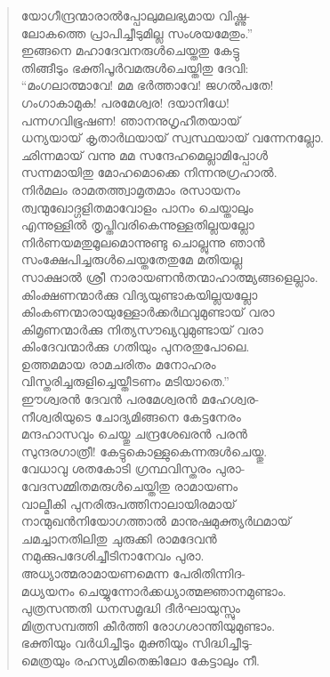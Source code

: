 \begin{verse}
യോഗീന്ദ്രന്മാരാല്‍പ്പോലുമലഭ്യമായ വിഷ്ണു-\\
ലോകത്തെ പ്രാപിച്ചീടുമില്ല സംശയമേതും.”\\
ഇങ്ങനെ മഹാദേവനരുള്‍ചെയ്തതു കേട്ടു\\
തിങ്ങീടും ഭക്തിപൂര്‍വമരുള്‍ചെയ്തിതു ദേവി:\\
“മംഗലാത്മാവേ! മമ ഭര്‍ത്താവേ! ജഗല്‍പതേ!\\
ഗംഗാകാമുക! പരമേശ്വര! ദയാനിധേ!\\
പന്നഗവിഭൂഷണ! ഞാനനുഗൃഹീതയായ്\\
ധന്യയായ് കൃതാര്‍ഥയായ് സ്വസ്ഥയായ് വന്നേനല്ലോ.\\
ഛിന്നമായ് വന്നു മമ സന്ദേഹമെല്ലാമിപ്പോള്‍\\
സന്നമായിതു മോഹമൊക്കെ നിന്നനുഗ്രഹാല്‍.\\
നിര്‍മലം രാമതത്ത്വാമൃതമാം രസായനം\\
ത്വന്മുഖോദ്ഗളിതമാവോളം പാനം ചെയ്താലും\\
എന്നുള്ളില്‍ തൃപ്തിവരികെന്നുള്ളതില്ലയല്ലോ\\
നിര്‍ണയമതുമൂലമൊന്നുണ്ടു ചൊല്ലുന്നു ഞാന്‍\\
സംക്ഷേപിച്ചരുള്‍ചെയ്തതേതുമേ മതിയല്ല\\
സാക്ഷാല്‍ ശ്രീ നാരായണന്‍തന്മാഹാത്മ്യങ്ങളെല്ലാം.\\
കിംക്ഷണന്മാര്‍ക്കു വിദ്യയുണ്ടാകയില്ലയല്ലോ\\
കിംകണന്മാരായുള്ളോര്‍ക്കര്‍ഥവുമുണ്ടായ് വരാ\\
കിമൃണന്മാര്‍ക്കു നിത്യസൗഖ്യവുമുണ്ടായ് വരാ\\
കിംദേവന്മാര്‍ക്കു ഗതിയും പുനരതുപോലെ.\\
ഉത്തമമായ രാമചരിതം മനോഹരം\\
വിസ്തരിച്ചരുളിച്ചെയ്തീടണം മടിയാതെ.”\\
ഈശ്വരന്‍ ദേവന്‍ പരമേശ്വരന്‍ മഹേശ്വര-\\
നീശ്വരിയുടെ ചോദ്യമിങ്ങനെ കേട്ടനേരം\\
മന്ദഹാസവും ചെയ്തു ചന്ദ്രശേഖരന്‍ പരന്‍\\
സുന്ദരഗാത്രീ! കേട്ടുകൊള്ളുകെന്നരുള്‍ചെയ്തു.\\
വേധാവു ശതകോടി ഗ്രന്ഥവിസ്തരം പുരാ-\\
വേദസമ്മിതമരുള്‍ചെയ്തിതു രാമായണം\\
വാല്മീകി പുനരിരുപത്തിനാലായിരമായ്\\
നാന്മുഖന്‍നിയോഗത്താല്‍ മാനുഷമുക്ത്യര്‍ഥമായ്\\
ചമച്ചാനതിലിതു ചുരുക്കി രാമദേവന്‍\\
നമുക്കുപദേശിച്ചീടിനാനേവം പുരാ.\\
അധ്യാത്മരാമായണമെന്ന പേരിതിന്നിദ-\\
മധ്യയനം ചെയ്യുന്നോര്‍ക്കധ്യാത്മജ്ഞാനമുണ്ടാം.\\
പുത്രസന്തതി ധനസമൃദ്ധി ദീര്‍ഘായുസ്സും\\
മിത്രസമ്പത്തി കീര്‍ത്തി രോഗശാന്തിയുമുണ്ടാം.\\
ഭക്തിയും വര്‍ധിച്ചീടും മുക്തിയും സിദ്ധിച്ചീടു-\\
മെത്രയും രഹസ്യമിതെങ്കിലോ കേട്ടാലും നീ.
\end{verse}

